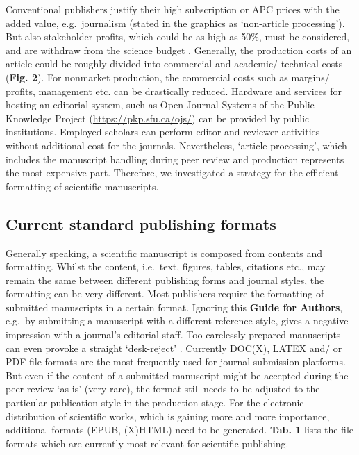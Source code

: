 \documentclass[10pt,fleqn]{wlpeerj}
\begin{document}
Conventional
publishers
justify
their
high
subscription
or
APC
prices
with
the
added
value,
e.g.~journalism
(stated
in
the
graphics
as
`non-article
processing').
But
also
stakeholder
profits,
which
could
be as
high
as
50\%,
must
be
considered,
and
are
withdraw
from
the
science
budget
\citep{van_noorden_open_2013}.
Generally,
the
production
costs
of an
article
could
be
roughly
divided
into
commercial
and
academic/
technical
costs
(\textbf{Fig.
2}).
For
nonmarket
production,
the
commercial
costs
such
as
margins/
profits,
management
etc.
can
be
drastically
reduced.
Hardware
and
services
for
hosting
an
editorial
system,
such
as
Open
Journal
Systems
of
the
Public
Knowledge
Project
(\url{https://pkp.sfu.ca/ojs/})
can
be
provided
by
public
institutions.
Employed
scholars
can
perform
editor
and
reviewer
activities
without
additional
cost
for
the
journals.
Nevertheless,
`article
processing',
which
includes
the
manuscript
handling
during
peer
review
and
production
represents
the
most
expensive
part.
Therefore,
we
investigated
a
strategy
for
the
efficient
formatting
of
scientific
manuscripts.

\subsection{Current
standard
publishing
formats}\label{current-standard-publishing-formats}

Generally
speaking,
a
scientific
manuscript
is
composed
from
contents
and
formatting.
Whilst
the
content,
i.e.~text,
figures,
tables,
citations
etc.,
may
remain
the
same
between
different
publishing
forms
and
journal
styles,
the
formatting
can
be
very
different.
Most
publishers
require
the
formatting
of
submitted
manuscripts
in a
certain
format.
Ignoring
this
\textbf{Guide
for
Authors},
e.g.~by
submitting
a
manuscript
with
a
different
reference
style,
gives
a
negative
impression
with
a
journal's
editorial
staff.
Too
carelessly
prepared
manuscripts
can
even
provoke
a
straight
`desk-reject'
\citep{volmer_how_2016}.
Currently
DOC(X),
LATEX
and/
or
PDF
file
formats
are
the
most
frequently
used
for
journal
submission
platforms.
But
even
if
the
content
of a
submitted
manuscript
might
be
accepted
during
the
peer
review
`as
is'
(very
rare),
the
format
still
needs
to be
adjusted
to
the
particular
publication
style
in
the
production
stage.
For
the
electronic
distribution
of
scientific
works,
which
is
gaining
more
and
more
importance,
additional
formats
(EPUB,
(X)HTML)
need
to be
generated.
\textbf{Tab.
1}
lists
the
file
formats
which
are
currently
most
relevant
for
scientific
publishing.
\end{document}
